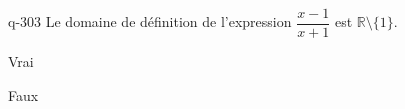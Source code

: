 \begin{truefalse}{q-303}
Le domaine de définition de l'expression $\dfrac{x-1}{x+1}$ est $\mathbb R \setminus \{1\}$.
\item Vrai
\item* Faux
\end{truefalse}

